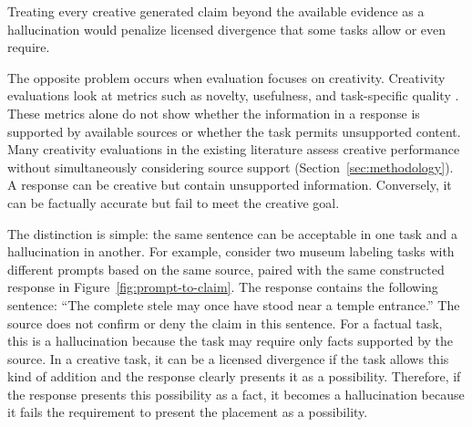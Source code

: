 \documentclass{clv2025}
\begin{document}
Treating every creative generated claim beyond the available evidence as a
hallucination would penalize licensed divergence that some tasks allow or even require.

The opposite problem occurs when evaluation focuses on creativity.
Creativity evaluations look at metrics such as novelty, usefulness, and
task-specific quality
\citep{runco_standard_2012,hou_creativityprism_2025,zhao_assessing_2025}.
These metrics alone do not show whether the information in a response is
supported by available sources or whether the task permits unsupported
content.
Many creativity evaluations in the existing literature assess creative performance without simultaneously considering source support (Section~\ref{sec:methodology}).
A response can be creative but contain unsupported
information. Conversely, it can be factually accurate but fail to meet the creative goal.


The distinction is simple: the same sentence can be acceptable in one task and
a hallucination in another. For example, consider two museum labeling tasks with different prompts based on the same
source, paired with the same constructed response in Figure~\ref{fig:prompt-to-claim}.
The response contains the following sentence: ``The complete stele may once
have stood near a temple entrance.'' The source does not confirm or deny
the claim in this sentence.
For a factual task, this is a hallucination because the task may require only
facts supported by the source. In a creative task, it can be a licensed divergence
if the task allows this kind of addition and the response clearly presents it
as a possibility.
Therefore, if the response presents this possibility as a fact, it becomes a hallucination
because it fails the requirement to present the placement as a possibility.
\end{document}
